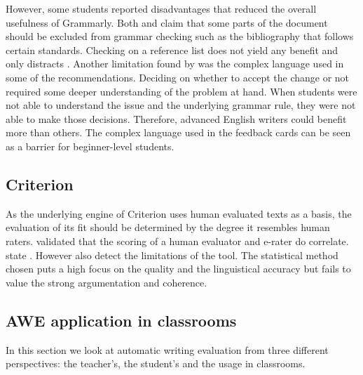 \documentclass[runningheads]{llncs}
\let\OldTextregistered\textregistered
\renewcommand{\textregistered}{\OldTextregistered\xspace}
\begin{document}
However, some students reported disadvantages that reduced the overall usefulness of Grammarly\textregistered. Both \textcite{ventayen_graduate_2018} and  \textcite{nova_utilizing_2018} claim that some parts of the document should be excluded from grammar checking such as the bibliography that follows certain standards. Checking on a reference list does not yield any benefit and only distracts \citep{ventayen_graduate_2018, nova_utilizing_2018}. Another limitation found by \textcite{cavaleri_you_2016} was the complex language used in some of the recommendations. Deciding on whether to accept the change or not required some deeper understanding of the problem at hand. When students were not able to understand the issue and the underlying grammar rule, they were not able to make those decisions. Therefore, advanced English writers could benefit more than others. The complex language used in the feedback cards can be seen as a barrier for beginner-level students. 

\subsection{Criterion\textregistered}
As the underlying engine of Criterion\textregistered uses human evaluated texts as a basis, the evaluation of its fit should be determined by the degree it resembles human raters. \textcite{weigle_validation_2010} validated that the scoring of a human evaluator and e-rater\textregistered do correlate. \citeauthor{lim_review_2012} state . However \textcite{lim_review_2012} also detect the limitations of the tool. The statistical method chosen puts a high focus on the quality and the linguistical accuracy but fails to value the strong argumentation and coherence. 

\subsection{AWE application in classrooms}
In this section we look at automatic writing evaluation from three different perspectives: the teacher's, the student's and the usage in classrooms. 
\end{document}

